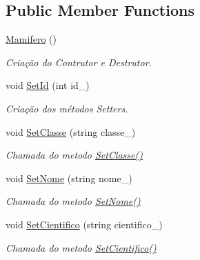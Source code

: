 \subsection*{Public Member Functions}
\begin{DoxyCompactItemize}
\item 
\mbox{\hyperlink{class_mamifero_adc6af2531b40fb6b0bc91cb5bbb205e8}{Mamifero}} ()
\begin{DoxyCompactList}\small\item\em Criação do Contrutor e Destrutor. \end{DoxyCompactList}\item 
void \mbox{\hyperlink{class_mamifero_af4889c9c225884eae0f5da5db0eb9bf3}{Set\+Id}} (int id\+\_\+)
\begin{DoxyCompactList}\small\item\em Criação dos métodos Setters. \end{DoxyCompactList}\item 
\mbox{\label{class_mamifero_ae4208a1463184117191a92dbbba14386}} 
void \mbox{\hyperlink{class_mamifero_ae4208a1463184117191a92dbbba14386}{Set\+Classe}} (string classe\+\_\+)
\begin{DoxyCompactList}\small\item\em Chamada do metodo \mbox{\hyperlink{class_mamifero_ae4208a1463184117191a92dbbba14386}{Set\+Classe()}} \end{DoxyCompactList}\item 
\mbox{\label{class_mamifero_a17c9d20e75ab1a92432792e99871de64}} 
void \mbox{\hyperlink{class_mamifero_a17c9d20e75ab1a92432792e99871de64}{Set\+Nome}} (string nome\+\_\+)
\begin{DoxyCompactList}\small\item\em Chamada do metodo \mbox{\hyperlink{class_mamifero_a17c9d20e75ab1a92432792e99871de64}{Set\+Nome()}} \end{DoxyCompactList}\item 
\mbox{\label{class_mamifero_a284d68ac9ac3c0cc5a08886117d7fe9b}} 
void \mbox{\hyperlink{class_mamifero_a284d68ac9ac3c0cc5a08886117d7fe9b}{Set\+Cientifico}} (string cientifico\+\_\+)
\begin{DoxyCompactList}\small\item\em Chamada do metodo \mbox{\hyperlink{class_mamifero_a284d68ac9ac3c0cc5a08886117d7fe9b}{Set\+Cientifico()}} \end{DoxyCompactList}\item 

\end{DoxyCompactItemize}
